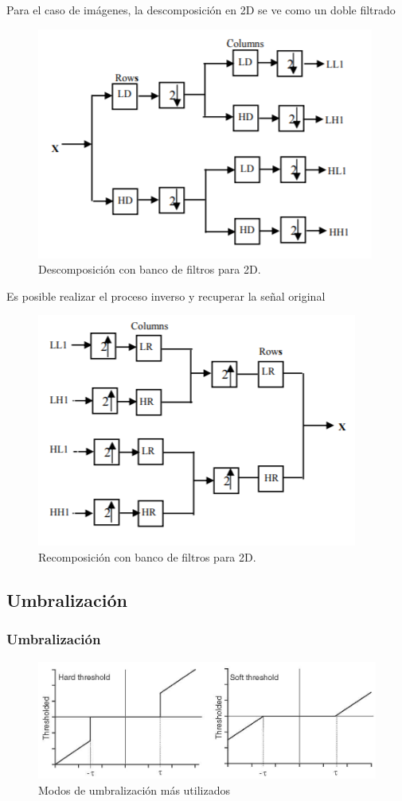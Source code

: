 \documentclass{beamer}
\begin{document}
\begin{frame}
Para el caso de imágenes, la descomposición en 2D se ve como un doble filtrado
\begin{figure}[H]
	\centering
	\includegraphics[width=.75\textwidth]{imgs/bancofiltros}
	\caption{Descomposición con banco de filtros para 2D.}
	\label{bancofiltros}
\end{figure}
\end{frame}
\begin{frame}
Es posible realizar el proceso inverso y recuperar la señal original
\begin{figure}[H]
	\centering
	\includegraphics[width=.75\textwidth]{imgs/bancofiltrosR}
	\caption{Recomposición con banco de filtros para 2D.}
	\label{bancofiltrosR}
\end{figure}
\end{frame}

\begin{frame}
\subsection{Umbralización}
\frametitle{Umbralización}
\centering
\begin{figure}[htb]
  \centering
  \includegraphics[scale=0.4]{imgs/Umbral}
  \caption{Modos de umbralización más utilizados}
  \label{}
\end{figure}
\end{frame}
\end{document}
